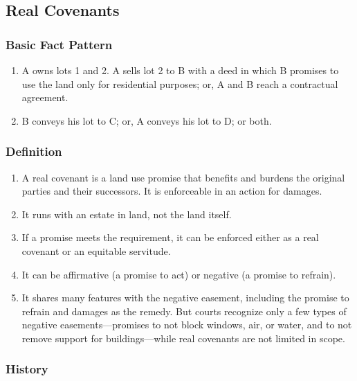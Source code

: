 \subsection{Real Covenants}

\subsubsection{Basic Fact Pattern}

\begin{enumerate}
    \item A owns lots 1 and 2. A sells lot 2 to B with a deed in which B 
    promises to use the land only for residential purposes; or, A and B reach 
    a contractual agreement.
    \item B conveys his lot to C; or, A conveys his lot to D; or both.
\end{enumerate}

\subsubsection{Definition}

\begin{enumerate}
    \item A real covenant is a land use promise that benefits and burdens the 
    original parties and their successors. It is enforceable in an action for 
    damages.
    \item It runs with an estate in land, not the land itself.
    \item If a promise meets the requirement, it can be enforced either as a 
    real covenant or an equitable servitude.
    \item It can be affirmative (a promise to act) or negative (a promise to 
    refrain).
    \item It shares many features with the negative easement, including the 
    promise to refrain and damages as the remedy. But courts recognize only a 
    few types of negative easements---promises to not block windows, air, or 
    water, and to not remove support for buildings---while real covenants are 
    not limited in scope.
\end{enumerate}

\subsubsection{History}

